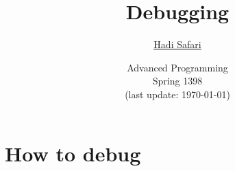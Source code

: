 \documentclass[xcolor={dvipsnames}]{beamer}
\title{Debugging}
\author{\href{mailto:hadi.safari@ut.ac.ir?subject=[AP\%20S98]\%20}{Hadi Safari}}
\institute[University of Tehran]{
    \texttt{[image: ut]}\\
    University of Tehran
}
\date[Advanced Programming (S98)]{
    Advanced Programming\\
    \small Spring 1398\\
    \footnotesize (last update: \today)
}
\begin{document}
\frame{\titlepage}



\section{How to debug}



\end{document}
